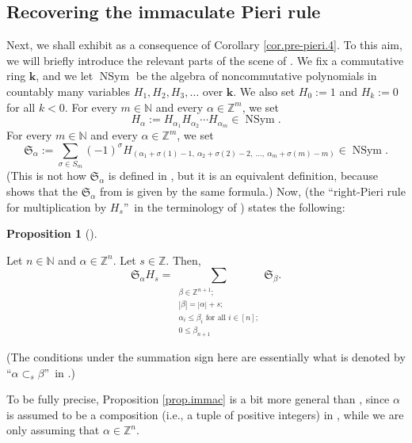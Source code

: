 \documentclass[numbers=enddot,12pt,final,onecolumn,notitlepage,english]{scrartcl}%
\theoremstyle{definition}
\newtheorem{prop}[theo]{Proposition}
\newenvironment{proposition}[1][]
{\begin{prop}[#1]\begin{leftbar}}
{\end{leftbar}\end{prop}}
\let\sumnonlimits\sum
\renewcommand{\sum}{\sumnonlimits\limits}
\begin{document}
\subsection{Recovering the immaculate Pieri rule}

Next, we shall exhibit \cite[Theorem 3.5]{BBSSZ13} as a consequence of
Corollary \ref{cor.pre-pieri.4}. To this aim, we will briefly introduce the
relevant parts of the scene of \cite[Theorem 3.5]{BBSSZ13}. We fix a
commutative ring $\mathbf{k}$, and we let $\operatorname*{NSym}$ be the
algebra of noncommutative polynomials in countably many variables $H_{1}%
,H_{2},H_{3},\ldots$ over $\mathbf{k}$. We also set $H_{0}:=1$ and $H_{k}:=0$
for all $k<0$. For every $m\in\mathbb{N}$ and every $\alpha\in\mathbb{Z}^{m}$,
we set%
\[
H_{\alpha}:=H_{\alpha_{1}}H_{\alpha_{2}}\cdots H_{\alpha_{m}}\in
\operatorname*{NSym}.
\]
For every $m\in\mathbb{N}$ and every $\alpha\in\mathbb{Z}^{m}$, we set
\[
\mathfrak{S}_{\alpha}:=\sum_{\sigma\in S_{m}}\left(  -1\right)  ^{\sigma
}H_{\left(  \alpha_{1}+\sigma\left(  1\right)  -1,\ \alpha_{2}+\sigma\left(
2\right)  -2,\ \ldots,\ \alpha_{m}+\sigma\left(  m\right)  -m\right)  }%
\in\operatorname*{NSym}.
\]
(This is not how $\mathfrak{S}_{\alpha}$ is defined in \cite{BBSSZ13}, but it
is an equivalent definition, because \cite[Theorem 3.27]{BBSSZ13} shows that
the $\mathfrak{S}_{\alpha}$ from \cite{BBSSZ13} is given by the same formula.)
Now, \cite[Theorem 3.5]{BBSSZ13} (the \textquotedblleft right-Pieri rule for
multiplication by $H_{s}$\textquotedblright\ in the terminology of
\cite{BBSSZ13}) states the following:

\begin{proposition}
\label{prop.immac}Let $n\in\mathbb{N}$ and $\alpha\in\mathbb{Z}^{n}$. Let
$s\in\mathbb{Z}$. Then,%
\[
\mathfrak{S}_{\alpha}H_{s}=\sum_{\substack{\beta\in\mathbb{Z}^{n+1}%
;\\\left\vert \beta\right\vert =\left\vert \alpha\right\vert +s;\\\alpha
_{i}\leq\beta_{i}\text{ for all }i\in\left[  n\right]  ;\\0\leq\beta_{n+1}%
}}\mathfrak{S}_{\beta}.
\]

\end{proposition}

(The conditions under the summation sign here are essentially what is denoted
by \textquotedblleft$\alpha\subset_{s}\beta$\textquotedblright\ in
\cite{BBSSZ13}.)

To be fully precise, Proposition \ref{prop.immac} is a bit more general than
\cite[Theorem 3.5]{BBSSZ13}, since $\alpha$ is assumed to be a composition
(i.e., a tuple of positive integers) in \cite[Theorem 3.5]{BBSSZ13}, while we
are only assuming that $\alpha\in\mathbb{Z}^{n}$.
\end{document}
